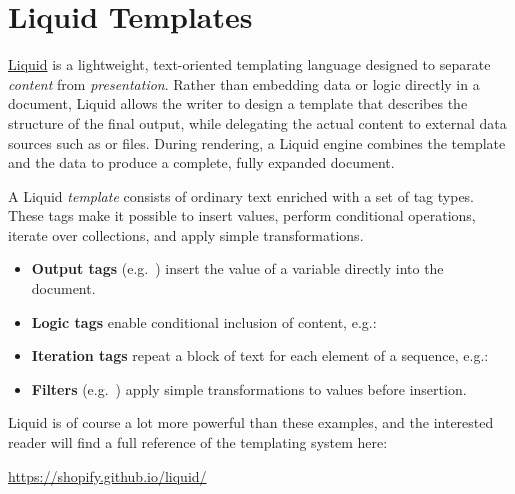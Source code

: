 \section{Liquid Templates}
\label{app:liquid-templates}

\href{https://shopify.github.io/liquid}{\sffamily Liquid} is a lightweight,
text-oriented templating language designed to separate \emph{content} from
\emph{presentation}. %
Rather than embedding data or logic directly in a document, Liquid allows
the writer to design a template that describes the structure of the final
output, while delegating the actual content to external data sources such
as  or \JSON{} files. %
During rendering, a Liquid engine combines the template and the data to
produce a complete, fully expanded document. %

\medskip

A Liquid \emph{template} consists of ordinary text enriched with a set of
tag types. %
These tags make it possible to insert values, perform conditional
operations, iterate over collections, and apply simple transformations. %

\begin{itemize}
  \item \textbf{Output tags} (e.g.\ ) insert
        the value of a variable directly into the document.
  \item \textbf{Logic tags} enable conditional inclusion of
    content, e.g.:
  \item \textbf{Iteration tags} repeat a block of text for
    each element of a sequence, e.g.:
  \item \textbf{Filters} (e.g.\ ) apply
        simple transformations to values before insertion.
\end{itemize}

\medskip

Liquid is of course a lot more powerful than these examples, and the
interested reader will find a full reference of the templating system here:
\begin{center}
  \url{https://shopify.github.io/liquid/}
\end{center}

